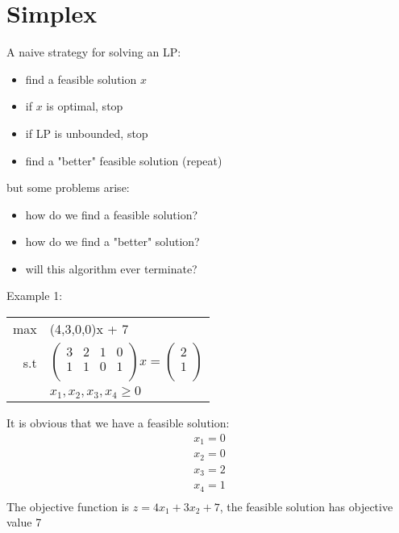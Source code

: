 \documentclass[letterpaper, 12pt]{article}
\begin{document}
    \section{Simplex}
    A naive strategy for solving an LP:
    \begin{itemize}
        \item find a feasible solution $x$
        \item if $x$ is optimal, stop
        \item if LP is unbounded, stop
        \item find a "better" feasible solution (repeat)
    \end{itemize}
    but some problems arise:
    \begin{itemize}
        \item how do we find a feasible solution?
        \item how do we find a "better" solution?
        \item will this algorithm ever terminate?
    \end{itemize}
    \bigskip
    Example 1:\\
    \begin{center}
        \begin{tabular}{rl}
            max & (4,3,0,0)x + 7\\
            s.t & $\begin{pmatrix}
                3 & 2 & 1 & 0\\
                1 & 1 & 0 & 1\\
            \end{pmatrix} x = \begin{pmatrix}
                2\\
                1\\
            \end{pmatrix}$\\
            & $x_1,x_2,x_3,x_4 \geq 0$\\
        \end{tabular}
    \end{center}
    It is obvious that we have a feasible solution:\\
    \begin{align*}
        x_1 = 0\\
        x_2 = 0\\
        x_3 = 2\\
        x_4 = 1\\
    \end{align*}
    The objective function is $z = 4x_1 + 3x_2 + 7$, the feasible solution has objective value 7\\
\end{document}
